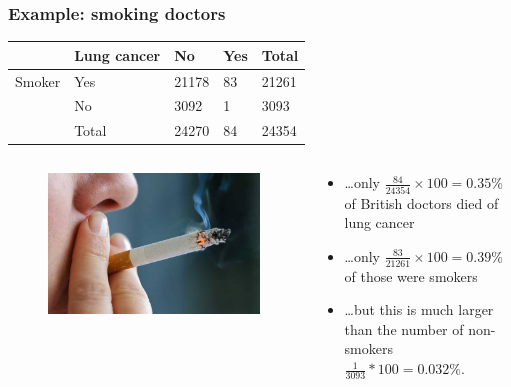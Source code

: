 \documentclass{beamer}
\begin{document}
\begin{frame}
  \frametitle{Example: smoking doctors}
  \begin{table}[h]
    \begin{tabular}{@{}lllll@{}}
      \toprule
            & \textbf{Lung cancer} & \textbf{No} & \textbf{Yes} & \textbf{Total} \\ \midrule
      Smoker & Yes                  & 21178       & 83           & 21261          \\
            & No                   & 3092        & 1            & 3093           \\
            & Total                & 24270       & 84           & 24354          \\ \bottomrule
    \end{tabular}
  \end{table}

  \begin{columns}
    \begin{column}{0.3 \textwidth}
  
    \begin{figure}
      \centering
        \includegraphics[width=1.00\textwidth]{img/les-6-smoking.jpg}
    \end{figure}
  
    \end{column}
    \begin{column}{0.7 \textwidth}
  
    \begin{itemize}
      \item \dots only $\frac{84}{ 24354} \times 100 = 0.35\% $ of British doctors died of lung cancer
      \item \dots only $\frac{83}{21261} \times 100 = 0.39\%$ of those were smokers
      \item \dots but this is much larger than the number of non-smokers $\frac{1}{3093} * 100 = 0.032\%$.
    \end{itemize}
    \end{column}
  \end{columns}
\end{frame}
\end{document}
